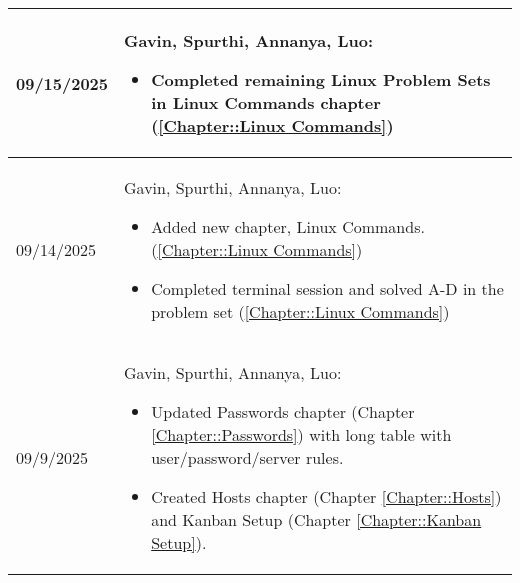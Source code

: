 \begin{longtable}{|l||p{13.5cm}|}
09/15/2025 & Gavin, Spurthi, Annanya, Luo:
\begin{itemize}[topsep=0pt,itemsep=0pt,parsep=0pt,partopsep=0pt,leftmargin=12pt]
\item Completed remaining Linux Problem Sets in Linux Commands chapter (\ref{Chapter::Linux Commands})
\end{itemize} 
\\ \hline

09/14/2025 & Gavin, Spurthi, Annanya, Luo:
\begin{itemize}[topsep=0pt,itemsep=0pt,parsep=0pt,partopsep=0pt,leftmargin=12pt]
\item Added new chapter, Linux Commands. (\ref{Chapter::Linux Commands})
\item Completed terminal session and solved A-D in the problem set  (\ref{Chapter::Linux Commands})
\end{itemize} 
\\ \hline



09/9/2025 & Gavin, Spurthi, Annanya, Luo:
\begin{itemize}[topsep=0pt,itemsep=0pt,parsep=0pt,partopsep=0pt,leftmargin=12pt]
\item Updated Passwords chapter (Chapter \ref{Chapter::Passwords}) with long table with user/password/server rules.
\item Created Hosts chapter (Chapter \ref{Chapter::Hosts}) and Kanban Setup (Chapter \ref{Chapter::Kanban Setup}).
\end{itemize} 
\\ \hline



\end{longtable}


